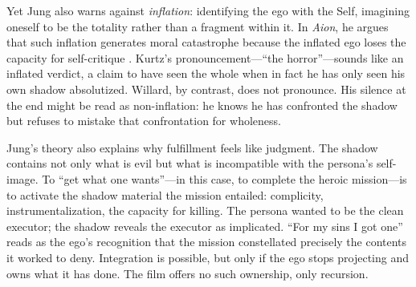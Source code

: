 Yet Jung also warns against \emph{inflation}: identifying the ego with the Self, imagining
oneself to be the totality rather than a fragment within it. In \textit{Aion}, he argues that
such inflation generates moral catastrophe because the inflated ego loses the capacity for
self-critique \parencite{JungAion1969}. Kurtz's pronouncement---``the horror''---sounds like
an inflated verdict, a claim to have seen the whole when in fact he has only seen his own
shadow absolutized. Willard, by contrast, does not pronounce. His silence at the end might be
read as non-inflation: he knows he has confronted the shadow but refuses to mistake that
confrontation for wholeness.

Jung's theory also explains why fulfillment feels like judgment. The shadow contains not only
what is evil but what is incompatible with the persona's self-image. To ``get what one
wants''---in this case, to complete the heroic mission---is to activate the shadow material
the mission entailed: complicity, instrumentalization, the capacity for killing. The persona
wanted to be the clean executor; the shadow reveals the executor as implicated. ``For my sins
I got one'' reads as the ego's recognition that the mission constellated precisely the
contents it worked to deny. Integration is possible, but only if the ego stops projecting and
owns what it has done. The film offers no such ownership, only recursion.
